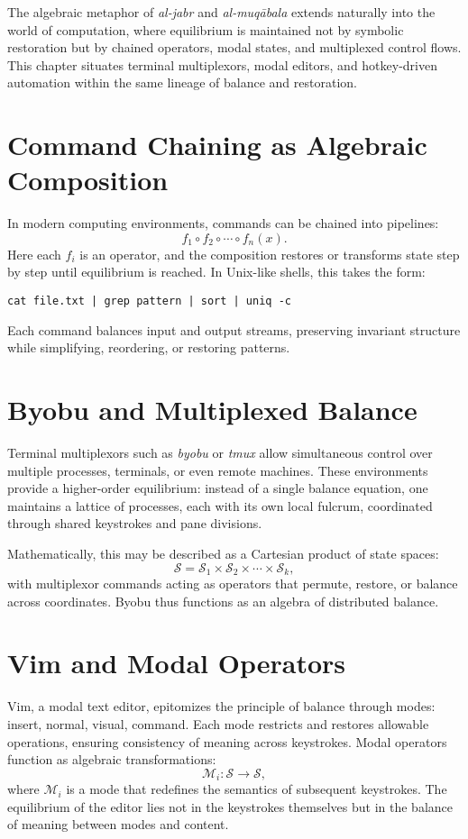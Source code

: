 \documentclass[a4paper,11pt,openany]{book}
\begin{document}
The algebraic metaphor of \emph{al-jabr} and \emph{al-muqābala} extends naturally into the world of computation, where equilibrium is maintained not by symbolic restoration but by chained operators, modal states, and multiplexed control flows. This chapter situates terminal multiplexors, modal editors, and hotkey-driven automation within the same lineage of balance and restoration.

\section{Command Chaining as Algebraic Composition}
In modern computing environments, commands can be chained into pipelines:
\[
f_1 \circ f_2 \circ \cdots \circ f_n(x).
\]
Here each $f_i$ is an operator, and the composition restores or transforms state step by step until equilibrium is reached. In Unix-like shells, this takes the form:
\begin{verbatim}
cat file.txt | grep pattern | sort | uniq -c
\end{verbatim}
Each command balances input and output streams, preserving invariant structure while simplifying, reordering, or restoring patterns.

\section{Byobu and Multiplexed Balance}
Terminal multiplexors such as \emph{byobu} or \emph{tmux} allow simultaneous control over multiple processes, terminals, or even remote machines. These environments provide a higher-order equilibrium: instead of a single balance equation, one maintains a lattice of processes, each with its own local fulcrum, coordinated through shared keystrokes and pane divisions.

Mathematically, this may be described as a Cartesian product of state spaces:
\[
\mathcal{S} = \mathcal{S}_1 \times \mathcal{S}_2 \times \cdots \times \mathcal{S}_k,
\]
with multiplexor commands acting as operators that permute, restore, or balance across coordinates. Byobu thus functions as an algebra of distributed balance.

\section{Vim and Modal Operators}
Vim, a modal text editor, epitomizes the principle of balance through modes: insert, normal, visual, command. Each mode restricts and restores allowable operations, ensuring consistency of meaning across keystrokes. Modal operators function as algebraic transformations:
\[
\mathcal{M}_i : \mathcal{S} \to \mathcal{S},
\]
where $\mathcal{M}_i$ is a mode that redefines the semantics of subsequent keystrokes. The equilibrium of the editor lies not in the keystrokes themselves but in the balance of meaning between modes and content.
\end{document}
